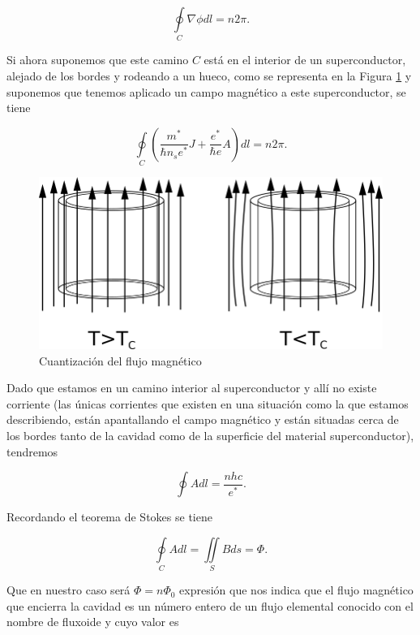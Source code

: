 \begin{equation}
    \oint\limits_C \nabla \phi dl = n 2 \pi .
\end{equation}

Si ahora suponemos que este camino $C$ está en el interior de un superconductor, alejado de los bordes y rodeando a un hueco, como se representa en la Figura \ref{fig:fluxquant} y suponemos que tenemos aplicado un campo magnético a este superconductor, se tiene

\begin{equation}
    \oint\limits_C (\frac{m^*}{\hbar n_s e^*} J + \frac{e^*}{\hbar e} A) dl = n 2 \pi .
\end{equation}

\begin{figure}[H]
\centering \includegraphics[width=0.8\linewidth]{img/fluxquant.png}
\caption{Cuantización del flujo magnético}
\label{fig:fluxquant}
\end{figure}

Dado que estamos en un camino interior al superconductor y allí no existe corriente (las únicas corrientes que existen en una situación como la que estamos describiendo, están apantallando el campo magnético y están situadas cerca de los bordes tanto de la cavidad como de la superficie del material superconductor), tendremos

\begin{equation}
    \oint A dl = \frac{n h c}{e^*} .
\end{equation}

Recordando el teorema de Stokes se tiene

\begin{equation}
    \oint\limits_C A dl = \iint\limits_S B ds = \Phi .
\end{equation}

Que en nuestro caso será $\Phi = n \Phi_0$ expresión que nos indica que el flujo magnético que encierra la cavidad es un número entero de un flujo elemental conocido con el nombre de fluxoide y cuyo valor es


